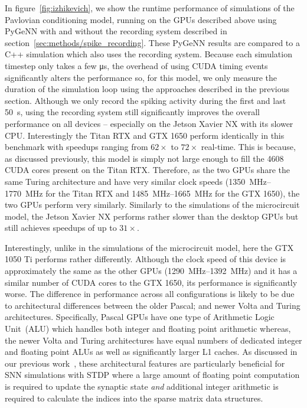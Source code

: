\documentclass[utf8]{frontiersSCNS} %
\begin{document}
In figure~\ref{fig:izhikevich}, we show the runtime performance of simulations of the Pavlovian conditioning model, running on the GPUs described above using PyGeNN with and without the recording system described in section~\ref{sec:methods/spike_recording}.%
These PyGeNN results are compared to a C++ simulation which also uses the recording system.%
Because each simulation timestep only takes a few \si{\micro\second}, the overhead of using CUDA timing events significantly alters the performance so, for this model, we only measure the duration of the simulation loop using the approaches described in the previous section.
Although we only record the spiking activity during the first and last \SI{50}{\second}, using the recording system still significantly improves the overall performance on all devices -- especially on the Jetson Xavier NX with its slower CPU.
Interestingly the Titan RTX and GTX 1650 perform identically in this benchmark with speedups ranging from $62\times$ to $72\times$ real-time.
This is because, as discussed previously, this model is simply not large enough to fill the \num{4608} CUDA cores present on the Titan RTX.
Therefore, as the two GPUs share the same Turing architecture and have very similar clock speeds (\SIrange{1350}{1770}{\mega\hertz} for the Titan RTX and \SIrange{1485}{1665}{\mega\hertz} for the GTX 1650), the two GPUs perform very similarly.
Similarly to the simulations of the microcircuit model, the Jetson Xavier NX performs rather slower than the desktop GPUs but still achieves speedups of up to $31\times$.

Interestingly, unlike in the simulations of the microcircuit model, here the GTX 1050 Ti performs rather differently. 
Although the clock speed of this device is approximately the same as the other GPUs (\SIrange{1290}{1392}{\mega\hertz}) and it has a similar number of CUDA cores to the GTX 1650, its performance is significantly worse.
The difference in performance across all configurations is likely to be due to architectural differences between the older Pascal; and newer Volta and Turing architectures.
Specifically, Pascal GPUs have one type of Arithmetic Logic Unit~(ALU) which handles both integer and floating point arithmetic whereas, the newer Volta and Turing architectures have equal numbers of dedicated integer and floating point ALUs as well as significantly larger L1 caches.
As discussed in our previous work~\citep{Knight2018}, these architectural features are particularly beneficial for SNN simulations with STDP where a large amount of floating point computation is required to update the synaptic state \emph{and} additional integer arithmetic is required to calculate the indices into the sparse matrix data structures.
\end{document}

